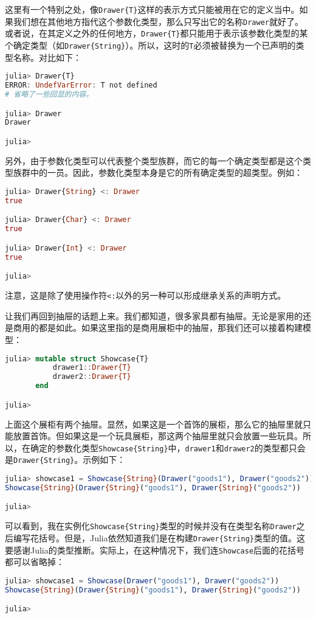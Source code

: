这里有一个特别之处，像\verb|Drawer{T}|这样的表示方式只能被用在它的定义当中。如果我们想在其他地方指代这个参数化类型，那么只写出它的名称\verb|Drawer|就好了。或者说，在其定义之外的任何地方，\verb|Drawer{T}|都只能用于表示该参数化类型的某个确定类型（如\verb|Drawer{String}|）。所以，这时的\verb|T|必须被替换为一个已声明的类型名称。对比如下：
\begin{lstlisting}[language=julia]
julia> Drawer{T} 
ERROR: UndefVarError: T not defined
# 省略了一些回显的内容。

julia> Drawer
Drawer

julia> 
\end{lstlisting}

另外，由于参数化类型可以代表整个类型族群，而它的每一个确定类型都是这个类型族群中的一员。因此，参数化类型本身是它的所有确定类型的超类型。例如：
\begin{lstlisting}[language=julia]
julia> Drawer{String} <: Drawer
true

julia> Drawer{Char} <: Drawer
true

julia> Drawer{Int} <: Drawer
true

julia> 
\end{lstlisting}

注意，这是除了使用操作符\verb|<:|以外的另一种可以形成继承关系的声明方式。

让我们再回到抽屉的话题上来。我们都知道，很多家具都有抽屉。无论是家用的还是商用的都是如此。如果这里指的是商用展柜中的抽屉，那我们还可以接着构建模型：
\begin{lstlisting}[language=julia]
julia> mutable struct Showcase{T}
           drawer1::Drawer{T}
           drawer2::Drawer{T}
       end

julia> 
\end{lstlisting}

上面这个展柜有两个抽屉。显然，如果这是一个首饰的展柜，那么它的抽屉里就只能放置首饰。但如果这是一个玩具展柜，那这两个抽屉里就只会放置一些玩具。所以，在确定的参数化类型\verb|Showcase{String}|中，\verb|drawer1|和\verb|drawer2|的类型都只会是\verb|Drawer{String}|。示例如下：
\begin{lstlisting}[language=julia]
julia> showcase1 = Showcase{String}(Drawer("goods1"), Drawer("goods2"))
Showcase{String}(Drawer{String}("goods1"), Drawer{String}("goods2"))

julia> 
\end{lstlisting}

可以看到，我在实例化\verb|Showcase{String}|类型的时候并没有在类型名称\verb|Drawer|之后编写花括号。但是，Julia依然知道我们是在构建\verb|Drawer{String}|类型的值。这要感谢Julia的类型推断。实际上，在这种情况下，我们连\verb|Showcase|后面的花括号都可以省略掉：
\begin{lstlisting}[language=julia]
julia> showcase1 = Showcase(Drawer("goods1"), Drawer("goods2"))
Showcase{String}(Drawer{String}("goods1"), Drawer{String}("goods2"))

julia> 
\end{lstlisting}

